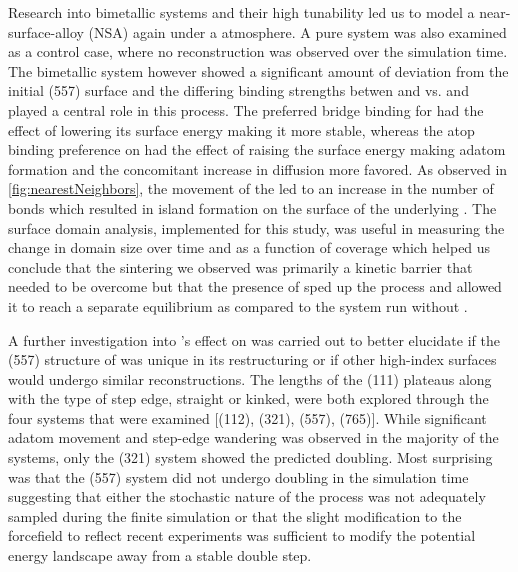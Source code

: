 Research into bimetallic systems and their high tunability led us to model a
 near-surface-alloy (NSA) again under a  atmosphere. A
pure  system was also examined as a control case, where no
reconstruction was observed over the simulation time. The bimetallic system
however showed a significant amount of deviation from the initial (557) surface
and the differing binding strengths betwen  and  vs.  and
 played a central role in this process. The preferred bridge binding for
 had the effect of lowering its surface energy making it more
stable, whereas the atop binding preference on  had the effect of
raising the surface energy making adatom formation and the concomitant increase
in diffusion more favored. As observed in \ref{fig:nearestNeighbors}, the
movement of the  led to an increase in the number of 
bonds which resulted in island formation on the surface of the underlying
. The surface domain analysis, implemented for this study, was useful in
measuring the change in domain size over time and as a function of 
coverage which helped us conclude that the sintering we observed was primarily
a kinetic barrier that needed to be overcome but that the presence of 
sped up the process and allowed it to reach a separate equilibrium as compared
to the system run without .

A further investigation into 's effect on  was carried out to
better elucidate if the (557) structure of  was unique in its
restructuring or if other high-index surfaces would undergo similar
reconstructions. The lengths of the (111) plateaus along with the type of step
edge, straight or kinked, were both explored through the four systems that were
examined [(112), (321), (557), (765)]. While significant adatom movement and
step-edge wandering was observed in the majority of the systems, only the (321)
system showed the predicted doubling. Most surprising was that the (557) system
did not undergo doubling in the simulation time suggesting that either the
stochastic nature of the process was not adequately sampled during the finite
simulation or that the slight modification to the  forcefield
to reflect recent experiments\citep{Deshlahra:2012aa} was sufficient to modify
the potential energy landscape away from a stable double step.

%



